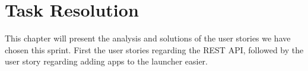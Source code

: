 \chapter{Task Resolution}

This chapter will present the analysis and solutions of the user stories we have chosen this sprint.
First the user stories regarding the REST API, followed by the user story regarding adding apps to the launcher easier.






